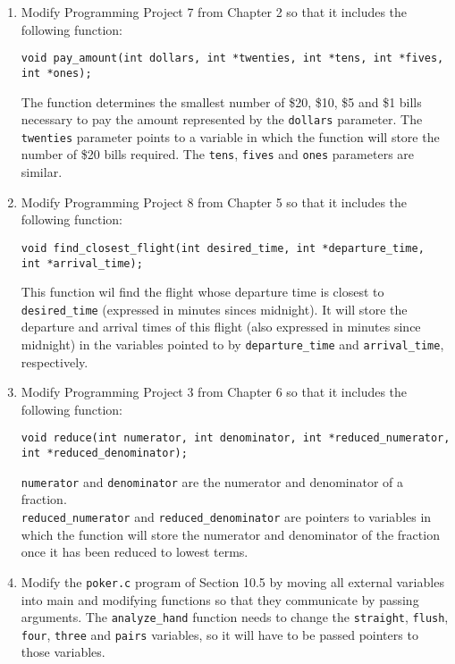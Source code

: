 \documentclass[12pt]{article}
\begin{document}
\begin{enumerate}[1.]
    \item Modify Programming Project 7 from Chapter 2 so that it includes the following
    function:

    \bigskip

    \texttt{void pay\_amount(int dollars, int *twenties, int *tens, int *fives,\\
    int *ones);}

    \bigskip

    The function determines the smallest number of \$20, \$10, \$5 and \$1 bills
    necessary to pay the amount represented by the \texttt{dollars} parameter. The \texttt{twenties}
    parameter points to a variable in which the function will store the number of
    \$20 bills required. The \texttt{tens}, \texttt{fives} and \texttt{ones} parameters are similar.

    \bigskip

    \item Modify Programming Project 8 from Chapter 5 so that it includes the
    following function:

    \bigskip

    \texttt{void find\_closest\_flight(int desired\_time, int *departure\_time,\\
    int *arrival\_time);}

    \bigskip

    This function wil find the flight whose departure time is closest to \texttt{desired\_time}
    (expressed in minutes sinces midnight). It will store the departure and arrival times of
    this flight (also expressed in minutes since midnight) in the variables pointed to by
    \texttt{departure\_time} and \texttt{arrival\_time}, respectively.

    \item Modify Programming Project 3 from Chapter 6 so that it includes the
    following function:

    \bigskip

    \texttt{void reduce(int numerator, int denominator, int *reduced\_numerator,\\
    int *reduced\_denominator);}

    \bigskip

    \texttt{numerator} and \texttt{denominator} are the numerator and denominator
    of a fraction.\\ \texttt{reduced\_numerator} and \texttt{reduced\_denominator} are pointers to
    variables in which the function will store the numerator and denominator of
    the fraction once it has been reduced to lowest terms.

    \item Modify the \texttt{poker.c} program of Section 10.5 by moving all external variables
    into main and modifying functions so that they communicate by passing arguments.
    The \texttt{analyze\_hand} function needs to change the \texttt{straight}, \texttt{flush}, \texttt{four}, \texttt{three}
    and \texttt{pairs} variables, so it will have to be passed pointers to those variables.

\end{enumerate}
\end{document}
